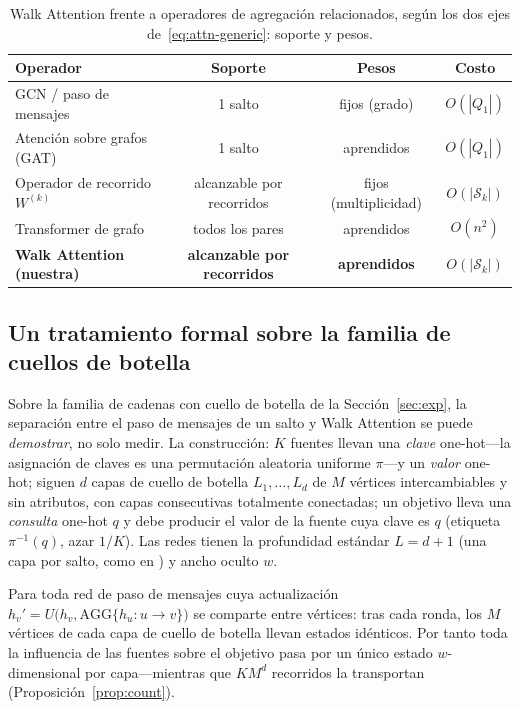 \documentclass[runningheads]{llncs}
\begin{document}
\begin{table}[t]
\centering
\caption{Walk Attention frente a operadores de agregación relacionados, según
los dos ejes de~\eqref{eq:attn-generic}: soporte y pesos.}
\label{tab:relation}
\begin{tabular}{lccc}
\toprule
\textbf{Operador} & \textbf{Soporte} & \textbf{Pesos} & \textbf{Costo} \\
\midrule
GCN / paso de mensajes       & 1 salto      & fijos (grado) & $O(|Q_1|)$ \\
Atención sobre grafos (GAT)  & 1 salto      & aprendidos    & $O(|Q_1|)$ \\
Operador de recorrido $W^{(k)}$ & alcanzable por recorridos & fijos (multiplicidad) & $O(|\mathcal{S}_k|)$ \\
Transformer de grafo         & todos los pares & aprendidos & $O(n^2)$ \\
\textbf{Walk Attention (nuestra)} & \textbf{alcanzable por recorridos} & \textbf{aprendidos} & $O(|\mathcal{S}_k|)$ \\
\bottomrule
\end{tabular}
\end{table}

\subsection{Un tratamiento formal sobre la familia de cuellos de botella}
\label{sec:theory}

Sobre la familia de cadenas con cuello de botella de la Sección~\ref{sec:exp},
la separación entre el paso de mensajes de un salto y Walk Attention se puede
\emph{demostrar}, no solo medir. La construcción: $K$ fuentes llevan una
\emph{clave} one-hot---la asignación de claves es una permutación aleatoria
uniforme $\pi$---y un \emph{valor} one-hot; siguen $d$ capas de cuello de
botella $L_1,\dots,L_d$ de $M$ vértices intercambiables y sin atributos, con
capas consecutivas totalmente conectadas; un objetivo lleva una \emph{consulta}
one-hot $q$ y debe producir el valor de la fuente cuya clave es $q$ (etiqueta
$\pi^{-1}(q)$, azar $1/K$). Las redes tienen la profundidad estándar $L=d+1$
(una capa por salto, como en \cite{alon2021bottleneck}) y ancho oculto $w$.

\begin{proposition}\label{prop:collapse}
Para toda red de paso de mensajes cuya actualización
$h_v'=U\bigl(h_v,\mathrm{AGG}\{h_u:u\to v\}\bigr)$ se comparte entre vértices:
tras cada ronda, los $M$ vértices de cada capa de cuello de botella llevan
estados idénticos. Por tanto toda la influencia de las fuentes sobre el
objetivo pasa por un único estado $w$-dimensional por capa---mientras que
$KM^{d}$ recorridos la transportan (Proposición~\ref{prop:count}).
\end{proposition}
\end{document}
